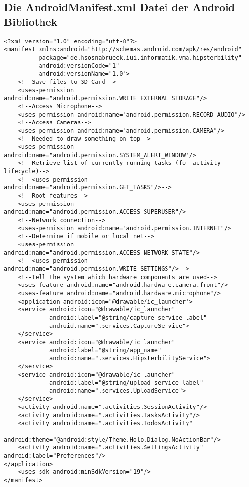 \subsection{Die AndroidManifest.xml Datei der Android Bibliothek\label{apdx:manifest}}

\begin{lstlisting}[label=lst:androidmanifest, caption=AndroidManifest.xml Datei der Android Bibliothek]
<?xml version="1.0" encoding="utf-8"?>
<manifest xmlns:android="http://schemas.android.com/apk/res/android"
          package="de.hsosnabrueck.iui.informatik.vma.hipsterbility"
          android:versionCode="1"
          android:versionName="1.0">
    <!--Save files to SD-Card-->
    <uses-permission android:name="android.permission.WRITE_EXTERNAL_STORAGE"/>
    <!--Access Microphone-->
    <uses-permission android:name="android.permission.RECORD_AUDIO"/>
    <!--Access Cameras-->
    <uses-permission android:name="android.permission.CAMERA"/>
    <!--Needed to draw something on top-->
    <uses-permission android:name="android.permission.SYSTEM_ALERT_WINDOW"/>
    <!--Retrieve list of currently running tasks (for activity lifecycle)-->
    <!--<uses-permission android:name="android.permission.GET_TASKS"/>-->
    <!--Root features-->
    <uses-permission android:name="android.permission.ACCESS_SUPERUSER"/>
    <!--Network connection-->
    <uses-permission android:name="android.permission.INTERNET"/>
    <!--Determine if mobile or local net-->
    <uses-permission android:name="android.permission.ACCESS_NETWORK_STATE"/>
    <!--<uses-permission android:name="android.permission.WRITE_SETTINGS"/>-->
    <!--Tell the system which hardware components are used-->
    <uses-feature android:name="android.hardware.camera.front"/>
    <uses-feature android:name="android.hardware.microphone"/>
    <application android:icon="@drawable/ic_launcher">
    <service android:icon="@drawable/ic_launcher"
             android:label="@string/capture_service_label"
             android:name=".services.CaptureService">
    </service>
    <service android:icon="@drawable/ic_launcher"
             android:label="@string/app_name"
             android:name=".services.HipsterbilityService">
    </service>
    <service android:icon="@drawable/ic_launcher"
             android:label="@string/upload_service_label"
             android:name=".services.UploadService">
    </service>
    <activity android:name=".activities.SessionActivity"/>
    <activity android:name=".activities.TasksActivity"/>
    <activity android:name=".activities.TodosActivity"
              android:theme="@android:style/Theme.Holo.Dialog.NoActionBar"/>
    <activity android:name=".activities.SettingsActivity" android:label="Preferences"/>
</application>
    <uses-sdk android:minSdkVersion="19"/>
</manifest>
\end{lstlisting}